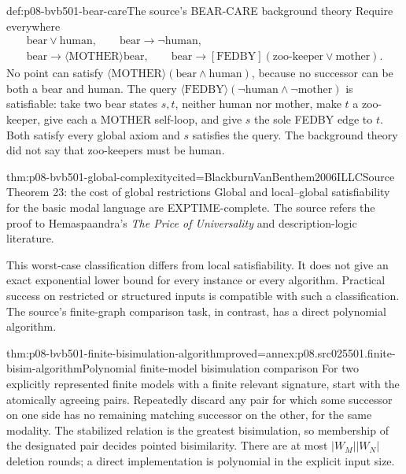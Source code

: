 \begin{hbexample}{def:p08-bvb501-bear-care}{The source's BEAR-CARE background theory}
Require everywhere
\[
 \begin{gathered}
 \mathrm{bear}\lor\mathrm{human},\qquad
 \mathrm{bear}\to\neg\mathrm{human},\\
 \mathrm{bear}\to\langle\mathrm{MOTHER}\rangle\mathrm{bear},\qquad
 \mathrm{bear}\to[\mathrm{FEDBY}](\mathrm{zoo\mbox{-}keeper}\lor\mathrm{mother}).
 \end{gathered}
\]
No point can satisfy
\(\langle\mathrm{MOTHER}\rangle(\mathrm{bear}\land\mathrm{human})\),
because no successor can be both a bear and human. The query
\(\langle\mathrm{FEDBY}\rangle(\neg\mathrm{human}\land\neg\mathrm{mother})\)
is satisfiable: take two bear states \(s,t\), neither human nor mother,
make \(t\) a zoo-keeper, give each a MOTHER self-loop, and give
\(s\) the sole FEDBY edge to \(t\). Both satisfy every global
axiom and \(s\) satisfies the query. The background theory did not
say that zoo-keepers must be human.
\end{hbexample}

\begin{hbtheorem}{thm:p08-bvb501-global-complexity}{cited=BlackburnVanBenthem2006ILLC}{Source Theorem 23: the cost of global restrictions}
Global and local--global satisfiability for the basic modal language are
EXPTIME-complete. The source refers the proof to Hemaspaandra's
\emph{The Price of Universality} and description-logic literature.
\end{hbtheorem}

This worst-case classification differs from local satisfiability. It does
not give an exact exponential lower bound for every instance or every
algorithm. Practical success on restricted or structured inputs is
compatible with such a classification. The source's finite-graph
comparison task, in contrast, has a direct polynomial algorithm.

\begin{hbtheorem}{thm:p08-bvb501-finite-bisimulation-algorithm}{proved=annex:p08.src025501.finite-bisim-algorithm}{Polynomial finite-model bisimulation comparison}
For two explicitly represented finite models with a finite relevant
signature, start with the atomically agreeing pairs. Repeatedly discard
any pair for which some successor on one side has no remaining matching
successor on the other, for the same modality. The stabilized relation
is the greatest bisimulation, so membership of the designated pair decides
pointed bisimilarity. There are at most \(|W_M||W_N|\) deletion rounds;
a direct implementation is polynomial in the explicit input size.
\end{hbtheorem}

